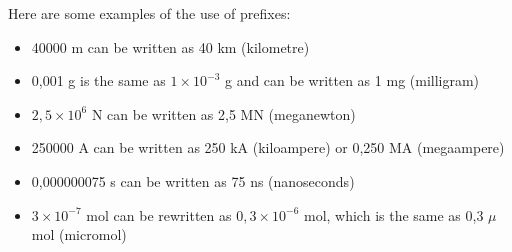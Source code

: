     \par
\label{m30853*notfhsst!!!underscore!!!id1000}
	\par
      \label{m30853*id66297}Here are some examples of the use of prefixes:\par 
      \label{m30853*id66300}\begin{itemize}[noitemsep]
            \label{m30853*uid33}\item 40000 m can be written as 40 km (kilometre)
\label{m30853*uid34}\item 0,001 g is the same as $1\ensuremath{\times}{10}^{-3}$ g and can be written as 1 mg (milligram)
\label{m30853*uid35}\item $2,5\ensuremath{\times}{10}^{6}$ N can be written as 2,5 MN (meganewton)
\label{m30853*uid36}\item 250000 A can be written as 250 kA (kiloampere) or 0,250 MA (megaampere)
\label{m30853*uid37}\item 0,000000075 s can be written as 75 ns (nanoseconds)
\label{m30853*uid38}\item $3\ensuremath{\times}{10}^{-7}$ mol can be rewritten as $0,3\ensuremath{\times}{10}^{-6}$ mol, which is the same as 0,3 $\mu $mol (micromol)
\end{itemize}
\label{m30853*secfhsst!!!underscore!!!id1016}
